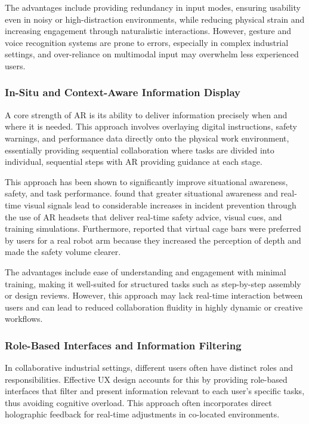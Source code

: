 The advantages include providing redundancy in input modes, ensuring usability even in noisy or high-distraction environments, while reducing physical strain and increasing engagement through naturalistic interactions. However, gesture and voice recognition systems are prone to errors, especially in complex industrial settings, and over-reliance on multimodal input may overwhelm less experienced users.

\subsubsection{In-Situ and Context-Aware Information Display}

A core strength of AR is its ability to deliver information precisely when and where it is needed. This approach involves overlaying digital instructions, safety warnings, and performance data directly onto the physical work environment, essentially providing sequential collaboration where tasks are divided into individual, sequential steps with AR providing guidance at each stage.

This approach has been shown to significantly improve situational awareness, safety, and task performance. \cite{putri2024enhancing} found that greater situational awareness and real-time visual signals lead to considerable increases in incident prevention through the use of AR headsets that deliver real-time safety advice, visual cues, and training simulations. Furthermore, \cite{cogurcu2023comparative} reported that virtual cage bars were preferred by users for a real robot arm because they increased the perception of depth and made the safety volume clearer.

The advantages include ease of understanding and engagement with minimal training, making it well-suited for structured tasks such as step-by-step assembly or design reviews. However, this approach may lack real-time interaction between users and can lead to reduced collaboration fluidity in highly dynamic or creative workflows.

\subsubsection{Role-Based Interfaces and Information Filtering}

In collaborative industrial settings, different users often have distinct roles and responsibilities. Effective UX design accounts for this by providing role-based interfaces that filter and present information relevant to each user's specific tasks, thus avoiding cognitive overload. This approach often incorporates direct holographic feedback for real-time adjustments in co-located environments.


